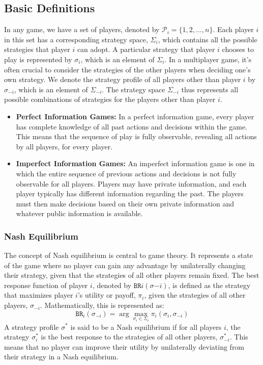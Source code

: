 \documentclass[11pt]{article}
\begin{document}
\subsection{Basic Definitions}
In any game, we have a set of players, denoted by $\mathcal{P}_i=\{1,2,...,n\}$. Each player $i$ in this set has a corresponding strategy space, $\Sigma_i$, which contains all the possible strategies that player $i$ can adopt. A particular strategy that player $i$ chooses to play is represented by $\sigma_i$, which is an element of $\Sigma_i$.
In a multiplayer game, it's often crucial to consider the strategies of the other players when deciding one's own strategy. We denote the strategy profile of all players other than player $i$ by $\sigma_{-i}$, which is an element of $\Sigma_{-i}$. The strategy space $\Sigma_{-i}$ thus represents all possible combinations of strategies for the players other than player $i$.
\begin{itemize}
  \item \textbf{Perfect Information Games:} In a perfect information game, every player has complete knowledge of all past actions and decisions within the game. This means that the sequence of play is fully observable, revealing all actions by all players, for every player.
  \item \textbf{Imperfect Information Games:} An imperfect information game is one in which the entire sequence of previous actions and decisions is not fully observable for all players. Players may have private information, and each player typically has different information regarding the past. The players must then make decisions based on their own private information and whatever public information is available.
  \end{itemize}

\subsubsection{Nash Equilibrium}
The concept of Nash equilibrium is central to game theory. It represents a state of the game where no player can gain any advantage by unilaterally changing their strategy, given that the strategies of all other players remain fixed.
The best response function of player $i$, denoted by $\texttt{BR}i(\sigma{-i})$, is defined as the strategy that maximizes player $i$'s utility or payoff, $\pi_i$, given the strategies of all other players, $\sigma_{-i}$. Mathematically, this is represented as:
\begin{equation}
\texttt{BR}_i(\sigma_{-i}) = \arg\max_{\sigma_i \in \Sigma_i} \pi_i(\sigma_i,\sigma_{-i})
\end{equation}
A strategy profile $\sigma^*$ is said to be a Nash equilibrium if for all players $i$, the strategy $\sigma_i^*$ is the best response to the strategies of all other players, $\sigma_{-i}^*$. This means that no player can improve their utility by unilaterally deviating from their strategy in a Nash equilibrium.
\end{document}

